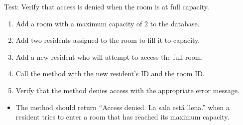 \documentclass[letterpaper,10pt,english]{sphinxmanual}
\begin{document}
\begin{fulllineitems}
\label{\detokenize{test:test.test_room.test_access_room_full_room}}
\pysigstartsignatures
\pysiglinewithargsret
{}
{}
{}
\pysigstopsignatures
\sphinxAtStartPar
Test: Verify that access is denied when the room is at full capacity.
\begin{description}
\begin{enumerate}
%
\item {} 
\sphinxAtStartPar
Add a room with a maximum capacity of 2 to the database.

\item {} 
\sphinxAtStartPar
Add two residents assigned to the room to fill it to capacity.

\item {} 
\sphinxAtStartPar
Add a new resident who will attempt to access the full room.

\item {} 
\sphinxAtStartPar
Call the  method with the new resident’s ID and the room ID.

\item {} 
\sphinxAtStartPar
Verify that the method denies access with the appropriate error message.

\end{enumerate}

\begin{itemize}
\item {} 
\sphinxAtStartPar
The method should return “Access denied. La sala está llena.”
when a resident tries to enter a room that has reached its maximum capacity.

\end{itemize}

\end{description}

\end{fulllineitems}

\end{document}
